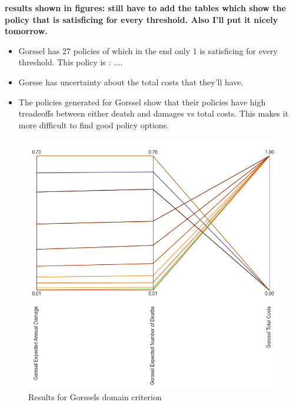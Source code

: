 \textbf{results shown in figures: still have to add the tables which show the policy that is satisficing for every threshold. Also I'll put it nicely tomorrow. }
\begin{itemize}
    \item Gorssel has 27 policies of which in the end only 1 is satisficing for every threshold. This policy is : ....
    \item Gorsse has uncertainty about the total costs that they'll have.
    \item The policies generated for Gorssel show that their policies have high treadeoffs between either deatsh and damages vs total costs. This makes it more difficult to find good policy options. 
\end{itemize}

\begin{figure}[H]
  \centering
  \begin{minipage}[b]{0.4\textwidth}
    \includegraphics[width=1.15\textwidth]{report/figures/results/domain_criterion_Gorssel.png}
    \caption{Results for Gorssels domain criterion}
    \label{fig:domain_criterion_gorssel}
  \end{minipage}
  \hfill
  \begin{minipage}[b]{0.4\textwidth}

\end{minipage}
\end{figure}
